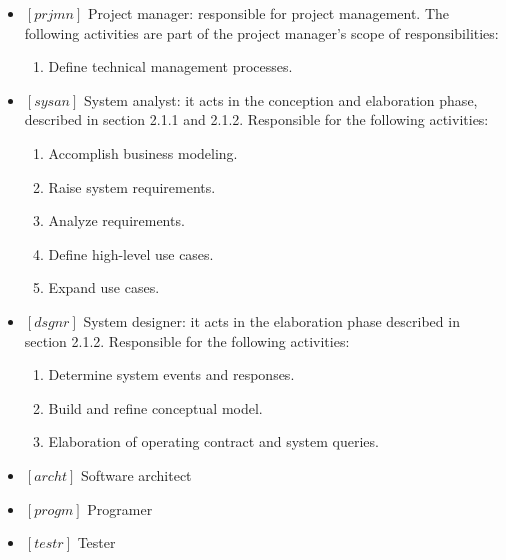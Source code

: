 \documentclass[11pt, twoside, a4paper]{book}
\begin{document}
				\begin{itemize}
        		        			
        			\item $[prjmn]$ Project manager: responsible for project management. The following activities are part of the project manager's scope of responsibilities:
        			
						\begin{enumerate}
							\item Define technical management processes.						
						\end{enumerate}					        			
        			
        			\item $[sysan]$ System analyst: it acts in the conception and elaboration phase, described in section 2.1.1 and 2.1.2. Responsible for the following activities:
        				\begin{enumerate}
        					\item Accomplish business modeling.
        					\item Raise system requirements.
        					\item Analyze requirements.
        					\item Define high-level use cases.
        					\item Expand use cases.
        				\end{enumerate}
        		
        			\item $[dsgnr]$ System designer: it acts in the elaboration phase described in section 2.1.2. Responsible for the following activities:
        				\begin{enumerate}
        					\item Determine system events and responses.
        					\item Build and refine conceptual model.
        					\item Elaboration of operating contract and system queries.
        				\end{enumerate}
        			
        			\item $[archt]$ Software architect
        			
        			\item $[progm]$ Programer
        			
        			\item $[testr]$ Tester
        			
        		\end{itemize}
                
\end{document}
